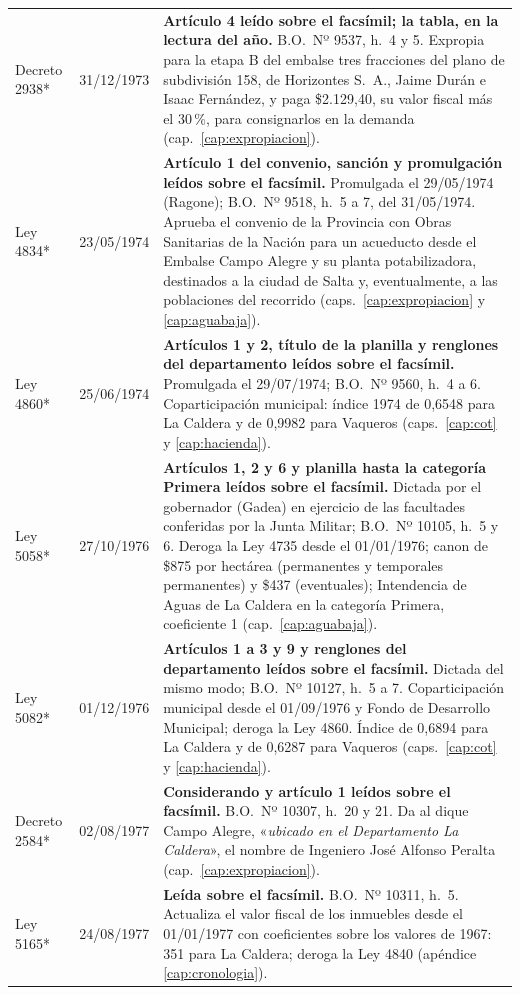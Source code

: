 \begin{longtable}{@{}p{3.2cm}p{1.9cm}p{7.9cm}@{}}
Decreto 2938* & 31/12/1973 & \textbf{Artículo 4 leído sobre el facsímil; la tabla, en la lectura del año.} B.O.\ Nº 9537, h.\ 4 y 5. Expropia para la etapa B del embalse tres fracciones del plano de subdivisión 158, de Horizontes S.\ A., Jaime Durán e Isaac Fernández, y paga \$2.129,40, su valor fiscal más el 30\,\%, para consignarlos en la demanda (cap.\ \ref{cap:expropiacion}). \\
Ley 4834* & 23/05/1974 & \textbf{Artículo 1 del convenio, sanción y promulgación leídos sobre el facsímil.} Promulgada el 29/05/1974 (Ragone); B.O.\ Nº 9518, h.\ 5 a 7, del 31/05/1974. Aprueba el convenio de la Provincia con Obras Sanitarias de la Nación para un acueducto desde el Embalse Campo Alegre y su planta potabilizadora, destinados a la ciudad de Salta y, eventualmente, a las poblaciones del recorrido (caps.\ \ref{cap:expropiacion} y \ref{cap:aguabaja}). \\
Ley 4860* & 25/06/1974 & \textbf{Artículos 1 y 2, título de la planilla y renglones del departamento leídos sobre el facsímil.} Promulgada el 29/07/1974; B.O.\ Nº 9560, h.\ 4 a 6. Coparticipación municipal: índice 1974 de 0,6548 para La Caldera y de 0,9982 para Vaqueros (caps.\ \ref{cap:cot} y \ref{cap:hacienda}). \\
Ley 5058* & 27/10/1976 & \textbf{Artículos 1, 2 y 6 y planilla hasta la categoría Primera leídos sobre el facsímil.} Dictada por el gobernador (Gadea) en ejercicio de las facultades conferidas por la Junta Militar; B.O.\ Nº 10105, h.\ 5 y 6. Deroga la Ley 4735 desde el 01/01/1976; canon de \$875 por hectárea (permanentes y temporales permanentes) y \$437 (eventuales); Intendencia de Aguas de La Caldera en la categoría Primera, coeficiente 1 (cap.\ \ref{cap:aguabaja}). \\
Ley 5082* & 01/12/1976 & \textbf{Artículos 1 a 3 y 9 y renglones del departamento leídos sobre el facsímil.} Dictada del mismo modo; B.O.\ Nº 10127, h.\ 5 a 7. Coparticipación municipal desde el 01/09/1976 y Fondo de Desarrollo Municipal; deroga la Ley 4860. Índice de 0,6894 para La Caldera y de 0,6287 para Vaqueros (caps.\ \ref{cap:cot} y \ref{cap:hacienda}). \\
Decreto 2584* & 02/08/1977 & \textbf{Considerando y artículo 1 leídos sobre el facsímil.} B.O.\ Nº 10307, h.\ 20 y 21. Da al dique Campo Alegre, «\textit{ubicado en el Departamento La Caldera}», el nombre de Ingeniero José Alfonso Peralta (cap.\ \ref{cap:expropiacion}). \\
Ley 5165* & 24/08/1977 & \textbf{Leída sobre el facsímil.} B.O.\ Nº 10311, h.\ 5. Actualiza el valor fiscal de los inmuebles desde el 01/01/1977 con coeficientes sobre los valores de 1967: 351 para La Caldera; deroga la Ley 4840 (apéndice \ref{cap:cronologia}). \\

\end{longtable}
